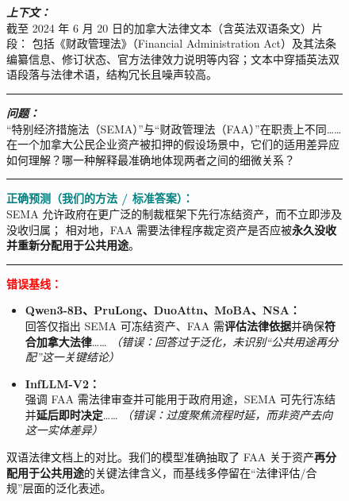 



\begin{figure}[ht]
\begin{AcademicBox}[案例 2：法律推理与文档理解]
\small
\setlength{\parindent}{0pt}

\textbf{\textit{上下文：}} \\
截至 2024 年 6 月 20 日的加拿大法律文本（含英法双语条文）片段：
包括《财政管理法》（Financial Administration Act）及其法条编纂信息、修订状态、官方法律效力说明等内容；文本中穿插英法双语段落与法律术语，结构冗长且噪声较高。
\vspace{4pt} \hrule \vspace{4pt}

\textbf{\textit{问题：}} \\
“特别经济措施法（SEMA）”与“财政管理法（FAA）”在职责上不同……在一个加拿大公民企业资产被扣押的假设场景中，它们的适用差异应如何理解？哪一种解释最准确地体现两者之间的细微关系？
\vspace{4pt} \hrule \vspace{4pt}

\textbf{\textcolor{teal}{正确预测（我们的方法 / 标准答案）：}} \hfill \textcolor{teal}{\checkmark} \\
SEMA 允许政府在更广泛的制裁框架下先行冻结资产，而不立即涉及没收归属；
相对地，FAA 需要法律程序裁定资产是否应被\textbf{永久没收并重新分配用于公共用途}。
\vspace{4pt} \hrule \vspace{4pt}

\textbf{\textcolor{red}{错误基线：}} \\
\footnotesize
\begin{itemize}[leftmargin=*, label={}, itemsep=4pt, topsep=2pt]

    \item \textbf{Qwen3-8B、PruLong、DuoAttn、MoBA、NSA：} \\
    回答仅指出 SEMA 可冻结资产、FAA 需\textbf{评估法律依据}并确保\textbf{符合加拿大法律}……
    \textit{（错误：回答过于泛化，未识别“公共用途再分配”这一关键结论）}

    \item \textbf{InfLLM-V2：} \\
    强调 FAA 需法律审查并可能用于政府用途，SEMA 可先行冻结并\textbf{延后即时决定}……
    \textit{（错误：过度聚焦流程时延，而非资产去向这一实体差异）}

\end{itemize}

\end{AcademicBox}
\caption{双语法律文档上的对比。我们的模型准确抽取了 FAA 关于资产\textbf{再分配用于公共用途}的关键法律含义，而基线多停留在“法律评估/合规”层面的泛化表述。}
\label{fig:case_legal}
\end{figure}

